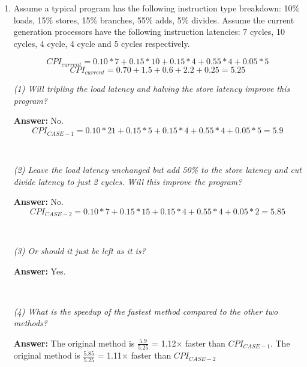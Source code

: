 \documentclass[12pt]{article}
\newenvironment{QandA}{\begin{enumerate}[label=\bfseries\alph*.]\bfseries}
                      {\end{enumerate}}
\newenvironment{answered}{\par\quad\normalfont}{}
\begin{document}
\begin{QandA}
   \item Assume a typical program has the following instruction type breakdown: 10\% loads, 15\% stores, 15\% branches, 55\% adds, 5\% divides. Assume the current generation processors have the following instruction latencies: 7 cycles, 10 cycles, 4 cycle, 4 cycle and 5 cycles respectively. 
        \begin{answered}
        \begin{equation*}
            CPI_{current} = 0.10 * 7 + 0.15 * 10 + 0.15 * 4 + 0.55 * 4 + 0.05 * 5
        \end{equation*}
        \begin{equation*}
            CPI_{current} = 0.70 + 1.5 + 0.6 + 2.2 + 0.25 = 5.25
        \end{equation*}
        
        \textit{(1) Will tripling the load latency and halving the store latency improve this program?}
        
        \textbf{Answer:} No.
        \begin{equation*}
            CPI_{CASE-1} = 0.10 * 21 + 0.15 * 5 + 0.15 * 4 + 0.55 * 4 + 0.05 * 5 = 5.9
        \end{equation*}
        
        \ 
        
        \textit{(2) Leave the load latency unchanged but add 50\% to the store latency and cut divide latency to just 2 cycles. Will this improve the program?}
        
        \textbf{Answer:} No.
        \begin{equation*}
            CPI_{CASE-2} = 0.10 * 7 + 0.15 * 15 + 0.15 * 4 + 0.55 * 4 + 0.05 * 2 = 5.85
        \end{equation*}
        
        \ 
        
        \textit{(3) Or should it just be left as it is?}
        
        \textbf{Answer:} Yes.
        
        \ 
        
        \textit{(4) What is the speedup of the fastest method compared to the other two methods?}
        
        \textbf{Answer:} The original method is $\frac{5.9}{5.25}$ = 1.12$\times$ faster than $CPI_{CASE-1}$. The original method is $\frac{5.85}{5.25}$ = 1.11$\times$ faster than $CPI_{CASE-2}$
        
        
        \end{answered}
\end{QandA}
\end{document}
